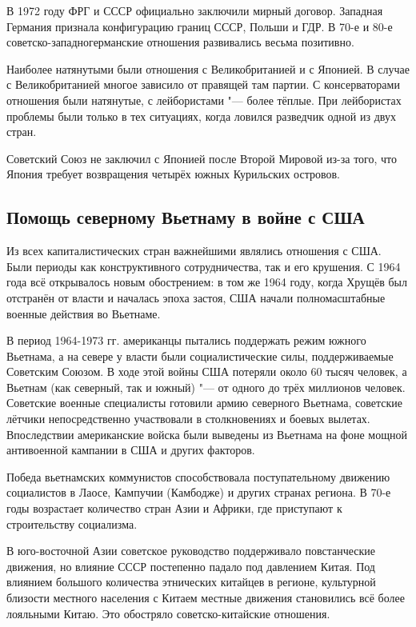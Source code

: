     В 1972 году ФРГ и СССР официально заключили мирный договор. Западная Германия признала конфигурацию границ СССР, Польши и ГДР. В 70-е и 80-е советско-западногерманские отношения развивались весьма позитивно.
    
    Наиболее натянутыми были отношения с Великобританией и с Японией. В случае с Великобританией многое зависило от правящей там партии. С консерваторами отношения были натянутые, с лейбористами "--- более тёплые. При лейбористах проблемы были только в тех ситуациях, когда ловился разведчик одной из двух стран.
    
    Советский Союз не заключил с Японией после Второй Мировой из-за того, что Япония требует возвращения четырёх южных Курильских островов.
    
    \subsection{Помощь северному Вьетнаму в войне с США}

    Из всех капиталистических стран важнейшими являлись отношения с США. Были периоды как конструктивного сотрудничества, так и его крушения. С 1964 года всё открывалось новым обострением: в том же 1964 году, когда Хрущёв был отстранён от власти и началась эпоха застоя, США начали полномасштабные военные действия во Вьетнаме.
  
    В период 1964-1973 гг. американцы пытались поддержать режим южного Вьетнама, а на севере у власти были социалистические силы, поддерживаемые Советским Союзом. В ходе этой войны США потеряли около 60 тысяч человек, а Вьетнам (как северный, так и южный) "--- от одного до трёх миллионов человек. Советские военные специалисты готовили армию северного Вьетнама, советские лётчики непосредственно участвовали в столкновениях и боевых вылетах. Впоследствии американские войска были выведены из Вьетнама на фоне мощной антивоенной кампании в США и других факторов.
    
    Победа вьетнамских коммунистов способствовала поступательному движению социалистов в Лаосе, Кампучии (Камбодже) и других странах региона. В 70-е годы возрастает количество стран Азии и Африки, где приступают к строительству социализма.
    
    В юго-восточной Азии советское руководство поддерживало повстанческие движения, но влияние СССР постепенно падало под давлением Китая. Под влиянием большого количества этнических китайцев в регионе, культурной близости местного населения с Китаем местные движения становились всё более лояльными Китаю. Это обостряло советско-китайские отношения.

